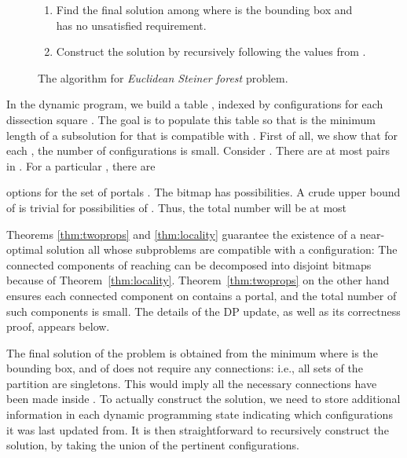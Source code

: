 \documentclass[extras,11pt]{article} \usepackage{fullpage}
\theoremstyle{mytheorem}
\newcommand{\prob}[1]{\textit{#1}}
\begin{document}
\begin{figure}
\begin{algorithm}
\begin{enumerate}
\begin{enumerate}
\end{enumerate}
\item Find the final solution among  where  is the bounding box and  has no unsatisfied requirement.
\item Construct the solution  by recursively following the values from .
\end{enumerate}
\end{algorithm}
\caption{The algorithm for \prob{Euclidean Steiner forest} problem.\label{fig:for-alg}}
\end{figure}

In the dynamic program, we build a table , indexed by configurations for each dissection square .
The goal is to populate this table so that  is the minimum length of a subsolution for  that is compatible with .
First of all, we show that for each , the number of configurations is small.
Consider .
There are at most  pairs in .
For a particular , there are

 options for the set of portals .
The bitmap  has  possibilities.
A crude upper bound of  is trivial for possibilities of .
Thus, the total number will be at most

Theorems \ref{thm:twoprops} and \ref{thm:locality} guarantee the existence of a near-optimal solution all whose subproblems are compatible with a  configuration:
The connected components of  reaching  can be decomposed into disjoint bitmaps
because of Theorem~\ref{thm:locality}.
Theorem~\ref{thm:twoprops} on the other hand ensures each connected component on  contains a portal, and the total number of such components is small.
The details of the DP update, as well as its correctness proof, appears 
below.  







The final solution of the problem is obtained from the minimum  where  is the bounding box, and  of  does not require any connections: i.e., all sets of the partition are singletons.
This would imply all the necessary connections have been made inside .
To actually construct the solution, we need to store additional information in each dynamic programming state indicating which configurations it was last updated from.
It is then straightforward to recursively construct the solution, by taking the union of the pertinent configurations.
\end{document}
